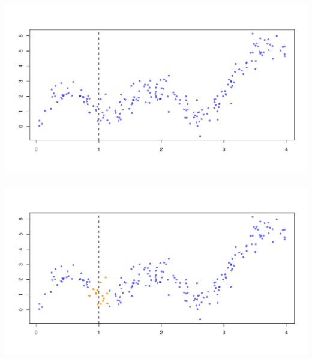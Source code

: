 \documentclass[xetex,mathserif,serif,aspectratio=169]{beamer}
\begin{document}
\begin{frame}[fragile] \frametitle{} \oldB \small

\begin{center}
\includegraphics[width=\textwidth]{img/knn1.pdf}
\end{center}

\end{frame}

\begin{frame}[fragile] \frametitle{} \oldB \small

\begin{center}
\includegraphics[width=\textwidth]{img/knn2.pdf}
\end{center}

\end{frame}
\end{document}
